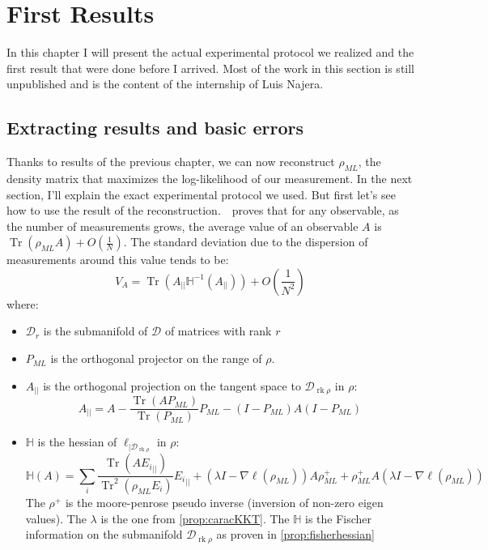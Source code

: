 \documentclass[10pt,a4paper]{report}
\theoremstyle{plain}
\theoremstyle{definition}
\theoremstyle{remark}
\DeclareMathOperator{\Tr}{Tr}
\DeclareMathOperator{\rk}{rk}
\newcommand{\ml}{_{M\!L}}
\begin{document}
\chapter{First Results}

In this chapter I will present the actual experimental protocol we realized and the
first result that were done before I arrived.
Most of the work in this section is still unpublished and is the
content of the internship of Luis Najera.

\section{Extracting results and basic errors}\label{sec:basicerr}

Thanks to results of the previous chapter, we can now reconstruct $\rho\ml$, the density matrix that maximizes the
log-likelihood of our measurement. In the next section, I'll explain the exact
experimental protocol we used. But first let's see how to use the result of the
reconstruction.~\cite{SPRAL17}~proves that for any observable, as the number of
measurements grows, the average value of an observable $A$ is $\Tr(\rho_{ML}A) +
O(\frac 1 N)$. The standard deviation due to the dispersion of measurements
 around this value tends to be:
\newcommand{\pr}{_{||}}
\newcommand{\inv}{^{-1}}
\begin{equation}\label{eqn:var}
V_A = \Tr(A\pr \mathbb H\inv(A\pr)) +O(\frac 1 {N^2})
\end{equation}
where:
\begin{itemize}
\item $\mathcal{D}_r$ is the submanifold of $\mathcal{D}$ of matrices with rank $r$
\item $P\ml$ is the orthogonal projector on the range of $\rho$.
\item $A\pr$ is
  the orthogonal projection on the tangent space to $\mathcal{D}_{\rk \rho}$ in
  $\rho$:
  \[A\pr = A - \frac{\Tr(AP\ml)}{\Tr(P\ml)}P\ml - (I-P\ml)A(I-P\ml)\]
\item $\mathbb H$ is the hessian of $\ell_{|\mathcal{D}_{\rk \rho}}$ in $\rho$:
  \[\mathbb{H}(A) = \sum_i \frac{\Tr(A{E_i}\pr)}{\Tr^2(\rho\ml E_i)} {E_i}\pr +
    (\lambda I - \nabla \ell(\rho\ml))A\rho\ml^+ +
    \rho\ml^+A(\lambda I - \nabla \ell(\rho\ml))\]
  The $\rho^+$ is the moore-penrose pseudo inverse (inversion of non-zero eigen
  values). The $\lambda$ is the one from \cref{prop:caracKKT}.
  The $\mathbb H$ is the Fischer information on the submanifold
  $\mathcal{D}_{\rk \rho}$ as proven in \cref{prop:fisherhessian}
\end{itemize}
\end{document}
